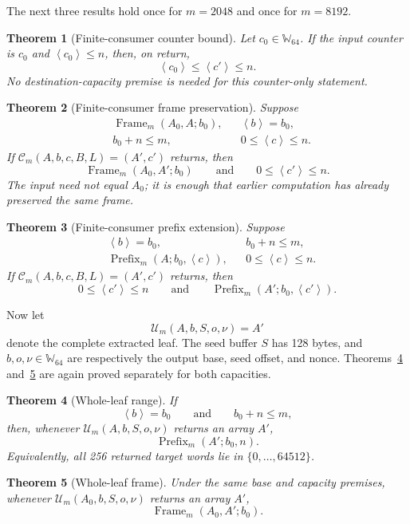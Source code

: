 \documentclass[11pt]{article}
\theoremstyle{definition}
\theoremstyle{plain}
\newtheorem{theorem}{Theorem}
\theoremstyle{remark}
\newcommand{\Wsixtyfour}{\mathbb W_{64}}
\newcommand{\uint}[1]{\left\langle #1\right\rangle}
\newcommand{\Frame}{\operatorname{Frame}}
\newcommand{\Prefix}{\operatorname{Prefix}}
\newcommand{\Consumer}{\mathcal C}
\newcommand{\Leaf}{\mathcal U}
\begin{document}
The next three results hold once for $m=2048$ and once for $m=8192$.

\begin{theorem}[Finite-consumer counter bound]
\label{thm:counter}
Let $c_0\in\Wsixtyfour$.  If the input counter is $c_0$ and
$\uint{c_0}\le n$, then, on return,
\[
  \uint{c_0}\le\uint{c'}\le n.
\]
No destination-capacity premise is needed for this counter-only statement.
\end{theorem}

\begin{theorem}[Finite-consumer frame preservation]
\label{thm:consumer-frame}
Suppose
\begin{align*}
  &\Frame_m(A_0,A;b_0),
  &&\uint{b}=b_0,\\
  &b_0+n\le m,
  &&0\le\uint{c}\le n.
\end{align*}
If
$\Consumer_m(A,b,c,B,L)=(A',c')$ returns, then
\[
  \Frame_m(A_0,A';b_0)
  \qquad\text{and}\qquad
  0\le\uint{c'}\le n.
\]
The input need not equal $A_0$; it is enough that earlier computation has
already preserved the same frame.
\end{theorem}

\begin{theorem}[Finite-consumer prefix extension]
\label{thm:consumer-range}
Suppose
\begin{align*}
  &\uint{b}=b_0,
  &&b_0+n\le m,\\
  &\Prefix_m(A;b_0,\uint{c}),
  &&0\le\uint{c}\le n.
\end{align*}
If
$\Consumer_m(A,b,c,B,L)=(A',c')$ returns, then
\[
  0\le\uint{c'}\le n
  \qquad\text{and}\qquad
  \Prefix_m(A';b_0,\uint{c'}).
\]
\end{theorem}

Now let
\[
  \Leaf_m(A,b,S,o,\nu)=A'
\]
denote the complete extracted leaf.  The seed buffer $S$ has 128 bytes, and
$b,o,\nu\in\Wsixtyfour$ are respectively the output base, seed offset, and
nonce.  Theorems~\ref{thm:leaf-range} and~\ref{thm:leaf-frame} are again
proved separately for both capacities.

\begin{theorem}[Whole-leaf range]
\label{thm:leaf-range}
If
\[
  \uint{b}=b_0
  \qquad\text{and}\qquad
  b_0+n\le m,
\]
then, whenever $\Leaf_m(A,b,S,o,\nu)$ returns an array $A'$,
\[
  \Prefix_m(A';b_0,n).
\]
Equivalently, all 256 returned target words lie in
$\{0,\ldots,64512\}$.
\end{theorem}

\begin{theorem}[Whole-leaf frame]
\label{thm:leaf-frame}
Under the same base and capacity premises, whenever
$\Leaf_m(A_0,b,S,o,\nu)$ returns an array $A'$,
\[
  \Frame_m(A_0,A';b_0).
\]
\end{theorem}
\end{document}
